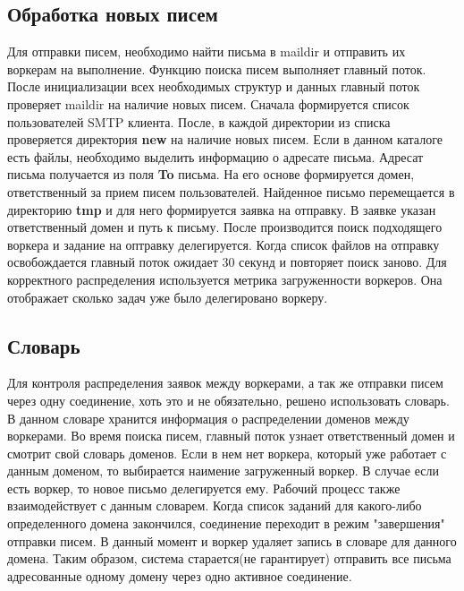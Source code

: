 \documentclass[a4paper,12pt]{report}
\begin{document}
\subsection*{Обработка новых писем}
Для отправки писем, необходимо найти письма в maildir и отправить их воркерам на выполнение. Функцию поиска писем выполняет главный поток. После инициализации всех необходимых структур и данных главный поток проверяет maildir на наличие новых писем. Сначала формируется список пользователей SMTP клиента. После, в каждой директории из списка проверяется директория \textbf{new} на наличие новых писем. Если в данном каталоге есть файлы, необходимо выделить информацию о адресате письма. Адресат письма получается из поля \textbf{To} письма. На его основе формируется домен, ответственный за прием писем пользователей. 
Найденное письмо перемещается в директорию \textbf{tmp} и для него формируется заявка на отправку. В заявке указан ответственный домен и путь к письму. После производится поиск подходящего воркера и задание на оптравку делегируется. Когда список файлов на отправку освобождается главный поток ожидает 30 секунд и повторяет поиск заново. Для корректного распределения используется метрика загруженности воркеров. Она отображает сколько задач уже было делегировано воркеру.

\subsection*{Словарь}
Для контроля распределения заявок между воркерами, а так же отправки писем через одну соединение, хоть это и не обязательно, решено использовать словарь. В данном словаре хранится информация о распределении доменов между воркерами. Во время поиска писем, главный поток узнает ответственный домен и смотрит свой словарь доменов. Если в нем нет воркера, который уже работает с данным доменом, то выбирается наимение загруженный воркер. В случае если есть воркер, то новое письмо делегируется ему.
Рабочий процесс также взаимодействует с данным словарем. Когда список заданий для какого-либо определенного домена закончился, соединение переходит в режим "завершения" отправки писем. В данный момент и воркер удаляет запись в словаре для данного домена. Таким образом, система старается(не гарантирует) отправить все письма адресованные одному домену через одно активное соединение.
\end{document}
